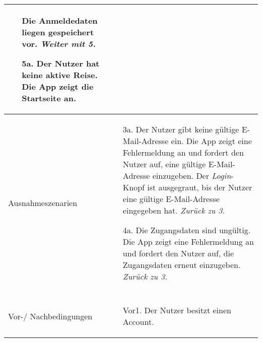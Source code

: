 \begin{table}[H]
\begin{tabularx}{0.95\textwidth}{ |l|X| }
\begin{enumerate}
				                                         \subitem[1a1.] Die Anmeldedaten liegen gespeichert vor. \emph{Weiter mit 5.}
			                                         \item[5a.] Der Nutzer hat keine aktive Reise.
				                                         \subitem[5a1.] Die App zeigt die Startseite an.
		                                         \end{enumerate}                                      \\
		\hline
		Ausnahmeszenarien                      & \begin{enumerate}[noitemsep]
			                                         \item[3a.] Der Nutzer gibt keine gültige E-Mail-Adresse ein.
				                                         \subitem[3a1.] Die App zeigt eine Fehlermeldung an und fordert den Nutzer auf, eine gültige E-Mail-Adresse einzugeben.
				                                         \subitem[3a2.] Der \emph{Login}-Knopf ist ausgegraut, bis der Nutzer eine gültige E-Mail-Adresse eingegeben hat. \emph{Zurück zu 3.}
			                                         \item[4a.] Die Zugangsdaten sind ungültig.
				                                         \subitem[4a1.] Die App zeigt eine Fehlermeldung an und fordert den Nutzer auf, die Zugangsdaten erneut einzugeben. \emph{Zurück zu 3.}
		                                         \end{enumerate} \\
		\hline
		\rowcolor{lightgray}                   &                                                                                                                                       \\
		\hline
		Vor-/ Nachbedingungen                  & \begin{enumerate}[noitemsep]
			                                         \item[Vor1.] Der Nutzer besitzt einen Account.
		                                         \end{enumerate}                                                                                         \\
		\hline
	\end{tabularx}
\end{table}


